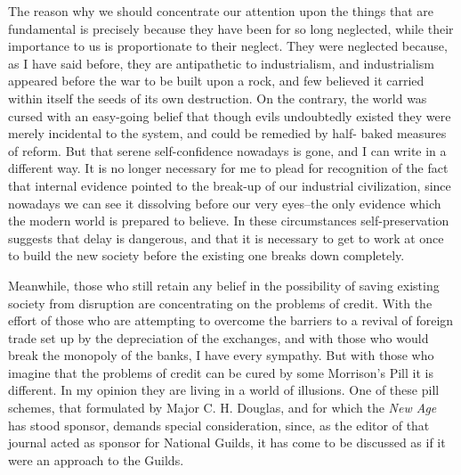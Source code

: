 \documentclass{book}
\begin{document}
The reason why we should concentrate our attention upon the things that are fundamental is precisely because they have been for so long neglected, while their importance to us is proportionate to their neglect. They were neglected because, as I have said before, they are antipathetic to industrialism, and industrialism appeared before the war to be built upon a rock, and few believed it carried within itself the seeds of its own destruction. On the contrary, the world was cursed with an easy-going belief that though evils undoubtedly existed they were merely incidental to the system, and could be remedied by half- baked measures of reform. But that serene self-confidence nowadays is gone, and I can write in a different way. It is no longer necessary for me to plead for recognition of the fact that internal evidence pointed to the break-up of our industrial civilization, since nowadays we can see it dissolving before our very eyes–the only evidence which the modern world is prepared to believe. In these circumstances self-preservation suggests that delay is dangerous, and that it is necessary to get to work at once to build the new society before the existing one breaks down completely.

Meanwhile, those who still retain any belief in the possibility of saving existing society from disruption are concentrating on the problems of credit. With the effort of those who are attempting to overcome the barriers to a revival of foreign trade set up by the depreciation of the exchanges, and with those who would break the monopoly of the banks, I have every sympathy. But with those who imagine that the problems of credit can be cured by some Morrison’s Pill it is different. In my opinion they are living in a world of illusions. One of these pill schemes, that formulated by Major C. H. Douglas, and for which the \emph{New Age} has stood sponsor, demands special consideration, since, as the editor of that journal acted as sponsor for National Guilds, it has come to be discussed as if it were an approach to the Guilds.
\end{document}
